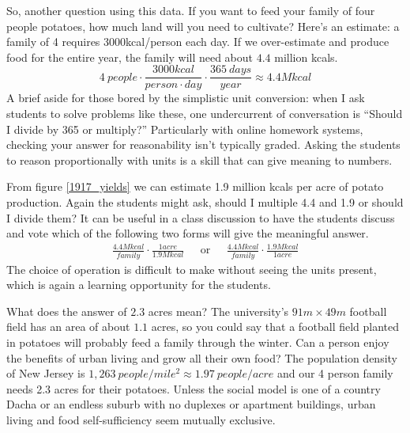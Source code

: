 \documentclass[12pt]{iopart}
\newcommand{\be}{\begin{equation}}
\newcommand{\ee}{\end{equation}}
\newcommand{\bea}{\begin{eqnarray}}
\newcommand{\eea}{\end{eqnarray}}
\begin{document}
So, another question using this data.  If you want to feed your family of four people potatoes, how much land will you need to cultivate?
Here's an estimate: a family of 4 requires 3000kcal/person each day\cite{calorie_age}.  If we over-estimate and produce food for the entire year, the family will need about $4.4$ million kcals.
\be
4~people\cdot\frac{3000kcal}{person\cdot day}\cdot\frac{365~days}{year} \approx 4.4 M kcal 
\ee
A brief aside for those bored by the simplistic unit conversion: when I ask students to solve problems like these, one undercurrent of conversation is ``Should I divide by 365 or multiply?''  Particularly with online homework systems, checking your answer for reasonability isn't  typically graded. Asking the students to reason proportionally with units is a skill that can give meaning to numbers. 

From figure \ref{1917_yields} we can estimate 1.9 million kcals per acre of potato production.  Again the students might ask, should I multiple 4.4 and 1.9 or should I divide them?  It can be useful in a class discussion to have the students discuss and vote which of the following two forms will give the meaningful answer.
\bea
\frac{4.4 M kcal}{family}\cdot\frac{1 acre}{1.9M kcal}  & \textrm{~~or~~}&
\frac{4.4 M kcal}{family}\cdot\frac{1.9M kcal}{1 acre}
\eea
The choice of operation is difficult to make without seeing the units present, which is again a learning opportunity for the students.

What does the answer of $2.3$ acres mean?  The university's $91m\times49m$ football field has an area of about $1.1$ acres, so you could say that a football field planted in potatoes will probably feed a family through the winter.  Can a person enjoy the benefits of urban living and grow all their own food?  The population density of New Jersey is $1,263~people/mile^2 \approx1.97~people/acre$ and our 4 person family needs 2.3 acres for their potatoes.  
Unless the social model is one of a country Dacha or an endless suburb with no duplexes or apartment buildings, urban living and food self-sufficiency seem mutually exclusive.
\end{document}
